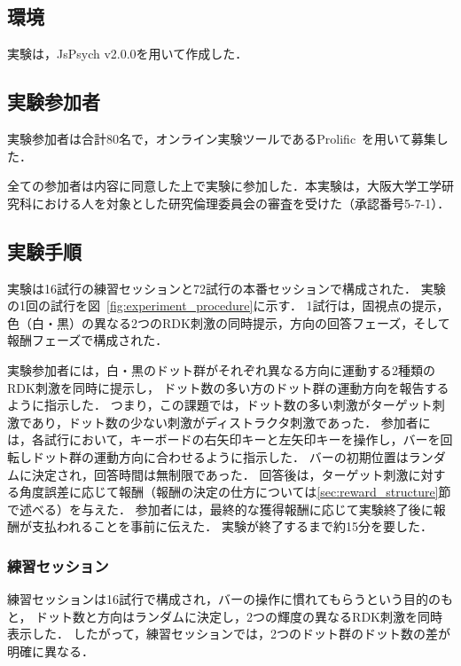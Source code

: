 \subsection{環境}
実験は，JsPsych v2.0.0を用いて作成した．

\subsection{実験参加者}
実験参加者は合計80名で，オンライン実験ツールであるProlific~\cite{palan2018prolific}を用いて募集した．

全ての参加者は内容に同意した上で実験に参加した．本実験は，大阪大学工学研究科における人を対象とした研究倫理委員会の審査を受けた（承認番号5-7-1）．

\subsection{実験手順}
実験は16試行の練習セッションと72試行の本番セッションで構成された．
実験の1回の試行を図~\ref{fig:experiment_procedure}に示す．
1試行は，固視点の提示，色（白・黒）の異なる2つのRDK刺激の同時提示，方向の回答フェーズ，そして報酬フェーズで構成された．

実験参加者には，白・黒のドット群がそれぞれ異なる方向に運動する2種類のRDK刺激を同時に提示し，
ドット数の多い方のドット群の運動方向を報告するように指示した．
つまり，この課題では，ドット数の多い刺激がターゲット刺激であり，ドット数の少ない刺激がディストラクタ刺激であった．
参加者には，各試行において，キーボードの右矢印キーと左矢印キーを操作し，バーを回転しドット群の運動方向に合わせるように指示した．
バーの初期位置はランダムに決定され，回答時間は無制限であった．
回答後は，ターゲット刺激に対する角度誤差に応じて報酬（報酬の決定の仕方については\ref{sec:reward_structure}節で述べる）を与えた．
参加者には，最終的な獲得報酬に応じて実験終了後に報酬が支払われることを事前に伝えた．
実験が終了するまで約15分を要した．

\subsubsection{練習セッション}
練習セッションは16試行で構成され，バーの操作に慣れてもらうという目的のもと，
ドット数と方向はランダムに決定し，2つの輝度の異なるRDK刺激を同時表示した．
したがって，練習セッションでは，2つのドット群のドット数の差が明確に異なる．

